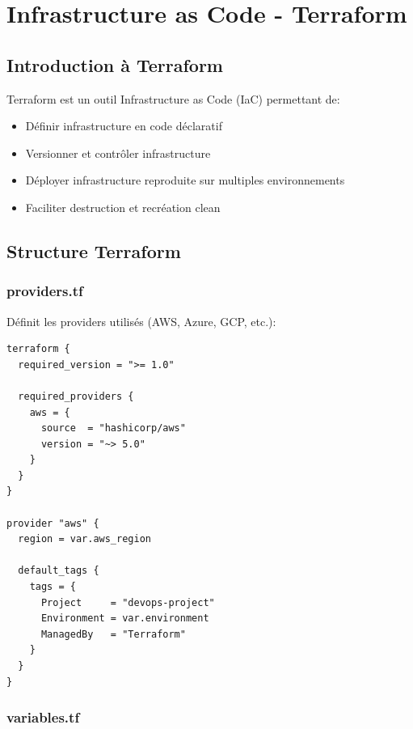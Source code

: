 \documentclass[12pt,a4paper]{report}
\begin{document}
\newpage

\chapter{Infrastructure as Code - Terraform}

\section{Introduction à Terraform}

Terraform est un outil Infrastructure as Code (IaC) permettant de:
\begin{itemize}
    \item Définir infrastructure en code déclaratif
    \item Versionner et contrôler infrastructure
    \item Déployer infrastructure reproduite sur multiples environnements
    \item Faciliter destruction et recréation clean
\end{itemize}

\section{Structure Terraform}

\subsection{providers.tf}

Définit les providers utilisés (AWS, Azure, GCP, etc.):

\lstset{language=hcl}
\begin{lstlisting}
terraform {
  required_version = ">= 1.0"
  
  required_providers {
    aws = {
      source  = "hashicorp/aws"
      version = "~> 5.0"
    }
  }
}

provider "aws" {
  region = var.aws_region

  default_tags {
    tags = {
      Project     = "devops-project"
      Environment = var.environment
      ManagedBy   = "Terraform"
    }
  }
}
\end{lstlisting}

\subsection{variables.tf}
\end{document}
